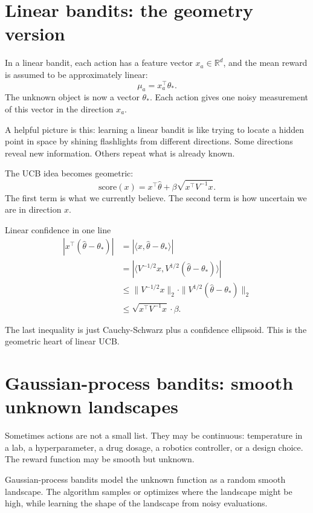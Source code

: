 \documentclass[en,nofont,11pt]{elegantbook}
\newcommand{\R}{\mathbb{R}}
\begin{document}
\section{Linear bandits: the geometry version}

In a linear bandit, each action has a feature vector $x_a\in\R^d$, and the mean reward is assumed to be approximately linear:
\[
\mu_a=x_a^\top\theta_*.
\]
The unknown object is now a vector $\theta_*$. Each action gives one noisy measurement of this vector in the direction $x_a$.

A helpful picture is this: learning a linear bandit is like trying to locate a hidden point in space by shining flashlights from different directions. Some directions reveal new information. Others repeat what is already known.

The UCB idea becomes geometric:
\[
\text{score}(x)=x^\top\widehat\theta+\beta\sqrt{x^\top V^{-1}x}.
\]
The first term is what we currently believe. The second term is how uncertain we are in direction $x$.

\begin{derivationbox}{Linear confidence in one line}
\[
\begin{aligned}
|x^\top(\widehat\theta-\theta_*)|
&=|\langle x,\widehat\theta-\theta_*\rangle|\\
&=|\langle V^{-1/2}x,V^{1/2}(\widehat\theta-\theta_*)\rangle|\\
&\leq \|V^{-1/2}x\|_2\cdot\|V^{1/2}(\widehat\theta-\theta_*)\|_2\\
&\leq \sqrt{x^\top V^{-1}x}\cdot \beta.
\end{aligned}
\]
\end{derivationbox}

The last inequality is just Cauchy-Schwarz plus a confidence ellipsoid. This is the geometric heart of linear UCB.

\section{Gaussian-process bandits: smooth unknown landscapes}

Sometimes actions are not a small list. They may be continuous: temperature in a lab, a hyperparameter, a drug dosage, a robotics controller, or a design choice. The reward function may be smooth but unknown.

Gaussian-process bandits model the unknown function as a random smooth landscape. The algorithm samples or optimizes where the landscape might be high, while learning the shape of the landscape from noisy evaluations.
\end{document}

